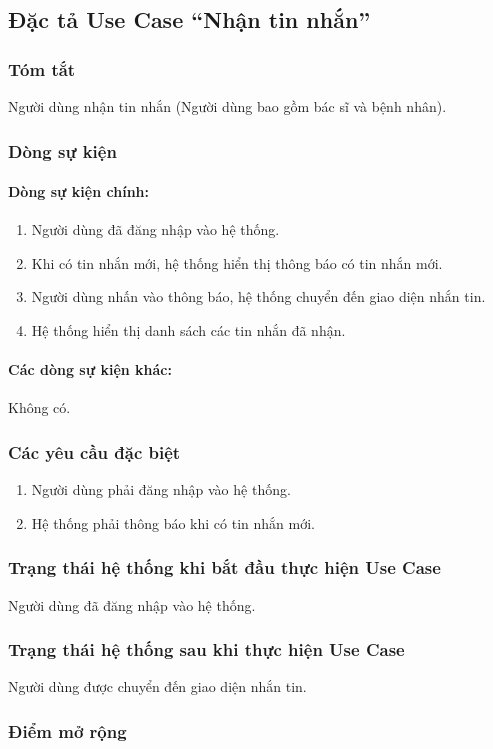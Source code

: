 \subsection{Đặc tả Use Case ``Nhận tin nhắn''}

\subsubsection{Tóm tắt}
Người dùng nhận tin nhắn (Người dùng bao gồm bác sĩ và bệnh nhân).

\subsubsection{Dòng sự kiện}
\paragraph{\textbf{Dòng sự kiện chính:}}
\begin{enumerate}
    \item Người dùng đã đăng nhập vào hệ thống.
    \item Khi có tin nhắn mới, hệ thống hiển thị thông báo có tin nhắn mới.
    \item Người dùng nhấn vào thông báo, hệ thống chuyển đến giao diện nhắn tin.
    \item Hệ thống hiển thị danh sách các tin nhắn đã nhận.
\end{enumerate}

\paragraph{\textbf{Các dòng sự kiện khác:}}
Không có.

\subsubsection{Các yêu cầu đặc biệt}
\begin{enumerate}
    \item Người dùng phải đăng nhập vào hệ thống.
    \item Hệ thống phải thông báo khi có tin nhắn mới.
\end{enumerate}

\subsubsection{Trạng thái hệ thống khi bắt đầu thực hiện Use Case}
Người dùng đã đăng nhập vào hệ thống.

\subsubsection{Trạng thái hệ thống sau khi thực hiện Use Case}
Người dùng được chuyển đến giao diện nhắn tin.

\subsubsection{Điểm mở rộng}
